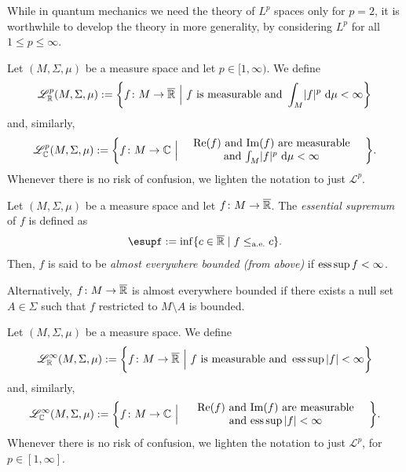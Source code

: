 While in quantum mechanics we need the theory of $L^p$ spaces only for $p=2$, it is worthwhile to develop the theory in more generality, by considering $L^p$ for all $1\leq p\leq \infty$.

\begin{definition}
Let $(M,\Sigma,\mu)$ be a measure space and let $p\in [1,\infty)$. We define
\begin{equation*}
\mathscr{L}^p_{\mathbb{R}}(M,\Sigma,\mu) := \biggl\{f\colon M \to \overline{\mathbb{R}}\ \Big| \ f \text{ is measurable and } \int_M\!|f|^p\,\mathop{}\!\mathrm{d} \mu < \infty\biggr\}
\end{equation*}
and, similarly,
\begin{equation*}
\mathscr{L}^p_{\C}(M,\Sigma,\mu)
:=
\biggl\{
f\cl M \to \C\
\Big|
\parbox{60mm}{\centering
\(\Re(f)\) and \(\Im(f)\) are measurable \\
and \(\int_M\!|f|^p\,\d \mu < \infty\)
}
\biggr\}.
\end{equation*}
Whenever there is no risk of confusion, we lighten the notation to just $\mathscr{L}^p$.
\end{definition}


\begin{definition}
Let $(M,\Sigma,\mu)$ be a measure space and let $f\colon M \to \overline{\mathbb{R}}$. The \emph{essential supremum} of $f$ is defined as
\begin{equation*}
\esup%
f := \inf\{c\in\overline{\R}\mid f \leq_{\mathrm{a.e.}}c\}.
\end{equation*}
Then, $f$ is said to be \emph{almost everywhere bounded (from above)} if $\operatorname*{ess\,sup} f < \infty$. 
\end{definition}

Alternatively, $f\colon M \to \overline{\mathbb{R}}$ is almost everywhere bounded if there exists a null set $A\in \Sigma$ such that $f$ restricted to $M\setminus A$ is bounded.

\begin{definition}
Let $(M,\Sigma,\mu)$ be a measure space. We define
\begin{equation*}
\mathscr{L}^{\infty}_{\mathbb{R}}(M,\Sigma,\mu) := \biggl\{f\colon M \to \overline{\mathbb{R}}\ \Big| \ f \text{ is measurable and } \operatorname*{ess\,sup} |f| < \infty\biggr\}
\end{equation*}
and, similarly,
\begin{equation*}
\mathscr{L}^{\infty}_{\C}(M,\Sigma,\mu)
:= \biggl\{
f\cl M \to \C
\ \Big| \
\parbox{60mm}{\centering
\(\Re(f)\) and \(\Im(f)\) are measurable \\
and \(\esup |f| < \infty\)
}
\biggr\}.
\end{equation*}
Whenever there is no risk of confusion, we lighten the notation to just $\mathscr{L}^p$, for $p\in[1,\infty]$.
\end{definition}

